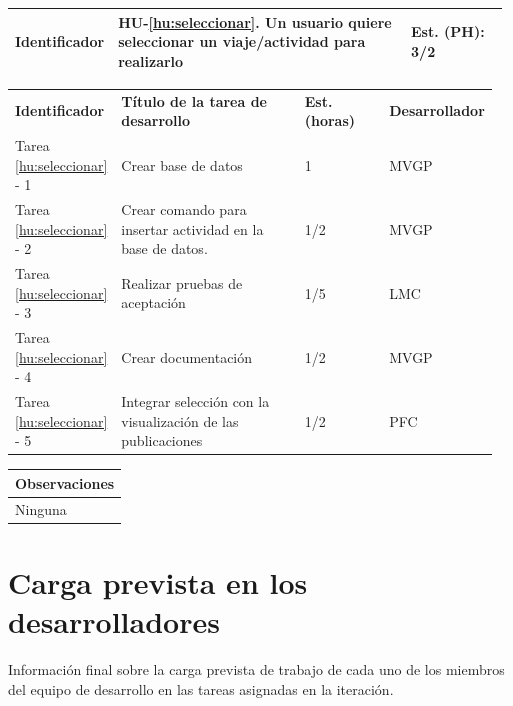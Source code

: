 \documentclass[11pt]{article}
\begin{document}
\begin{longtable}{p{0.18\linewidth}|p{0.6\linewidth}|p{0.2\linewidth}}
  \rowcolor{LightCyan}
  \textbf{Identificador} & \textbf{HU-\ref{hu:seleccionar}}. Un usuario quiere seleccionar un viaje/actividad para realizarlo& \textbf{Est. (PH):} 3/2 \\
  \bottomrule
\end{longtable}
\vspace{-0.5cm}
\begin{longtable}{p{0.18\linewidth}|p{0.4\linewidth}|p{0.18\linewidth}|p{0.2\linewidth}}
  \toprule
  \textbf{Identificador} & \textbf{Título de la tarea de desarrollo} & \textbf{Est. (horas)} & \textbf{Desarrollador} \\
  Tarea \ref{hu:seleccionar} - 1 &  Crear base de datos & 1 & MVGP\\
  Tarea \ref{hu:seleccionar} - 2 & Crear comando para insertar actividad en la base de datos. & 1/2 & MVGP\\
  Tarea \ref{hu:seleccionar} - 3 & Realizar pruebas de aceptación & 1/5 & LMC\\
  Tarea \ref{hu:seleccionar} - 4 & Crear documentación & 1/2 & MVGP\\
  Tarea \ref{hu:seleccionar} - 5 & Integrar selección con la visualización de las publicaciones & 1/2 & PFC\\
  \bottomrule
\end{longtable}
\vspace{-0.5cm}
\begin{longtable}{p{1.028\linewidth}}
  \textbf{Observaciones}\\
  \midrule
  Ninguna\\
  \bottomrule
\end{longtable}


\section{Carga prevista en los desarrolladores}

Información final sobre la carga prevista de trabajo de cada uno de los miembros del equipo de desarrollo en las tareas asignadas en la iteración.
\end{document}
